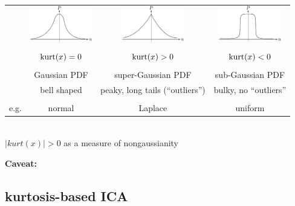 \begin{frame}

\\

\begin{tabular}[h]{c c c c}
&
\includegraphics[width=2.7cm]{img/section2_fig20} &
\includegraphics[width=2.7cm]{img/section2_fig21} & 
\includegraphics[width=2.7cm]{img/section2_fig22} \\ \\

& $\operatorname{kurt}(x) = 0$ & $\operatorname{kurt}(x) > 0$ & $\operatorname{kurt}(x) < 0$\\ \\

&
Gaussian PDF &
super-Gaussian PDF&
sub-Gaussian PDF\\
&bell shaped & peaky, long tails (``outliers'')& bulky, no ``outliers'' \\\\
e.g.&normal & Laplace & uniform
\end{tabular}\\[1cm]

$|kurt(x)| > 0$ as a measure of nongaussianity 

\textbf{Caveat:}
\end{frame}



\clearpage

\subsection{kurtosis-based ICA}

